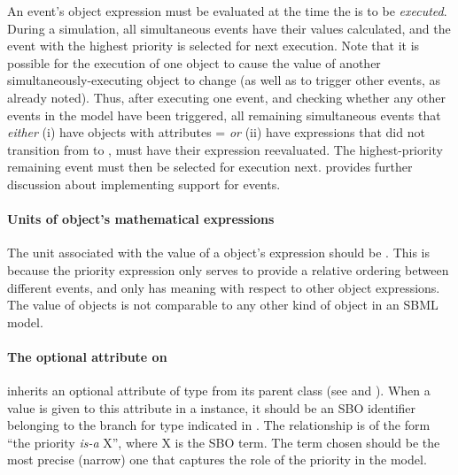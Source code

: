 An event's \Priority object  expression must be
evaluated at the time the \Event is to be \emph{executed}.  During
a simulation, all simultaneous events have their \Priority values
calculated, and the event with the highest priority is selected for
next execution.  Note that it is possible for the execution of one
\Event object to cause the \Priority value of another
simultaneously-executing \Event object to change (as well as to
trigger other events, as already noted).  Thus, after executing
one event, and checking whether any other events in the model have
been triggered, all remaining simultaneous events that
\emph{either} (i) have \Trigger objects with attributes
= \emph{or} (ii) have \Trigger
expressions that did not transition from  to
, must have their \Priority expression reevaluated.
The highest-priority remaining event must then be selected for 
execution next.   provides further
discussion about implementing support for events.


\paragraph{Units of  object's mathematical
  expressions}

The unit associated with the value of a \Priority object's
 expression should be .  This is
because the priority expression only serves to provide a relative
ordering between different events, and only has meaning with
respect to other \Priority object expressions.  The value of
\Priority objects is not comparable to any other kind of object in
an SBML model.


\label{sec:priority-id}



\paragraph{The optional  attribute on }
\label{sec:priority-sboterm}

\Priority inherits an optional  attribute of type
 from its parent class \SBase (see
 and ).  When a
value is given to this attribute in a \Priority instance, it
should be an SBO identifier belonging to the branch for type
\Priority indicated in .  The
relationship is of the form ``the priority \emph{is-a} X'', where
X is the SBO term.  The term chosen should be the most precise
(narrow) one that captures the role of the priority in the model.

